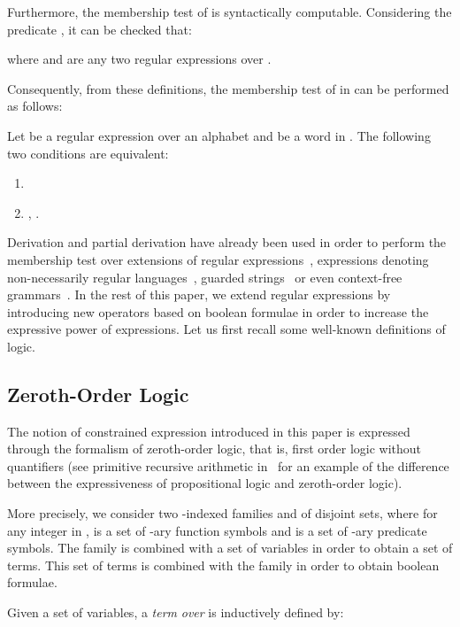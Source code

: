 \documentclass[a4paper]{llncs}
\begin{document}
  Furthermore, the membership test of  is syntactically computable. Considering the predicate , it can be checked that:
  
  where  and  are any two regular expressions over .
    
  Consequently, from these definitions, the membership test of  in  can be performed as follows:
  
  \begin{proposition}
    Let  be a regular expression over an alphabet  and  be a word in . The following two conditions are equivalent:
    \begin{enumerate}
      \item 
      \item , .
    \end{enumerate}
  \end{proposition}
  
  Derivation and  partial derivation have already been used in order to perform the membership test over extensions of regular expressions~\cite{CCM11b,CCM12c,CCM14,CJM13}, expressions denoting non-necessarily regular languages~\cite{CDJM13}, guarded strings~\cite{ABM12} or even context-free grammars~\cite{MDS11}.  
  In the rest of this paper, 
we extend regular expressions by introducing new operators based on boolean formulae  
  in order to increase the expressive  power of expressions. 
Let us first recall some well-known definitions of logic.

  \subsection{Zeroth-Order Logic}
  
  The notion of constrained expression introduced in this paper is expressed through the formalism of zeroth-order logic, that is, first order logic without quantifiers (see primitive recursive arithmetic in~\cite{Sko67} for an example of the difference between the expressiveness of propositional logic and zeroth-order logic).
  
  More precisely, we consider two -indexed families  and  of disjoint sets, where for any integer  in ,  is a set of -ary function symbols and  is a set of -ary predicate symbols. The family   is combined with a set of variables in order to obtain a set of terms. This set of terms is combined with the family  in order to obtain boolean formulae.
  
  Given a set  of variables, a \emph{term}  \emph{over}  is inductively defined by:
  
\end{document}
